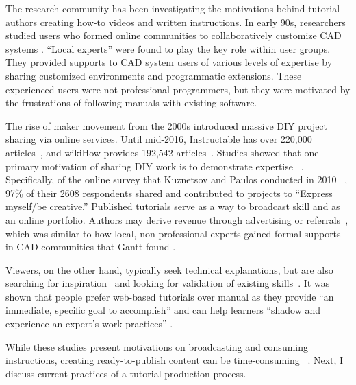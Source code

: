The research community has been investigating the motivations behind tutorial authors creating how-to videos and written instructions.
%
In early 90s, researchers studied users who formed online communities to collaboratively customize CAD systems \cite{Gantt:1992:GGP:142750.142767}. ``Local experts'' were found to play the key role within user groups. They provided supports to CAD system users of various levels of expertise by sharing customized environments and programmatic extensions. These experienced users were not professional programmers, but they were motivated by the frustrations of following manuals with existing software.

The rise of maker movement from the 2000s introduced massive DIY project sharing via online services. Until mid-2016, Instructable has over 220,000 articles~\cite{InstructablesProjects}, and wikiHow provides 192,542 articles~\cite{wikiHowStatistics}.
%
Studies showed that one primary motivation of sharing DIY work is to demonstrate expertise ~\cite{Torrey:2007he,Kuznetsov:2010:REA:1868914.1868950}. Specifically, of the online survey that Kuznetsov and Paulos conducted in 2010 ~\cite{Kuznetsov:2010:REA:1868914.1868950}, 97\% of their 2608 respondents shared and contributed to projects to ``Express myself/be creative.'' Published tutorials serve as a way to broadcast skill and as an online portfolio.
%
Authors may derive revenue through advertising or referrals~\cite{Lafreniere:2012tl}, which was similar to how local, non-professional experts gained formal supports in CAD communities that Gantt \ea{} found \cite{Gantt:1992:GGP:142750.142767}.

Viewers, on the other hand, typically seek technical explanations, but are also searching for inspiration~\cite{Torrey:2009fc} and looking for validation of existing skills~\cite{Lafreniere:2012tl}.
%
It was shown that people prefer web-based tutorials over manual as they provide ``an immediate, specific goal to accomplish'' and can help learners ``shadow and experience an expert's work practices'' \cite{BenLafreniere:2013ux}.

While these studies present motivations on broadcasting and consuming instructions, creating ready-to-publish content can be time-consuming ~\cite{Kuznetsov:2010:REA:1868914.1868950}. Next, I discuss current practices of a tutorial production process.


